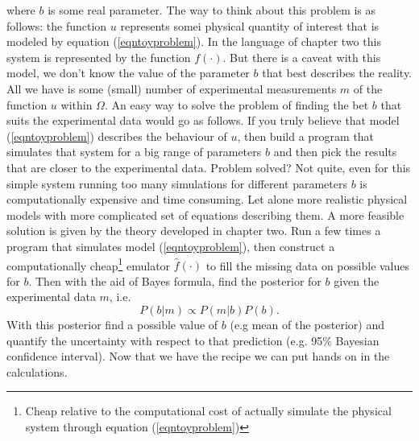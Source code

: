 \documentclass[12pt]{book}
\begin{document}
where $b$ is some real parameter. The  way to think about this problem is as follows: the 
function $u$ represents somei physical quantity of interest that is modeled by equation (\ref{eqntoyproblem}).
In the language of chapter two this system is represented by the function $f(\cdot)$. But there is a 
caveat with this model, we don't know the value of the parameter $b$ that best describes the reality.
All we have is some (small) number of experimental measurements $m$  of the function $u$ within $\Omega$. 
An easy way to solve the problem of finding the bet $b$ that suits the experimental data would go as follows.
If you truly believe that model (\ref{eqntoyproblem}) describes the behaviour of $u$, then build
a program that simulates that system for a big range of parameters $b$ and then pick the results
that are closer to the experimental data. Problem solved? Not quite, even for this simple system
running too many simulations for different parameters $b$ is computationally expensive and time
consuming. Let alone more realistic physical models with more complicated set of equations describing
them. 
\newline
A more feasible solution is given by the theory developed in chapter two. Run a few times a program
that simulates model (\ref{eqntoyproblem}), then construct a computationally cheap\footnote{Cheap relative
to the computational cost of actually simulate the physical system through equation (\ref{eqntoyproblem})}
 emulator $\hat{f}(\cdot)$ to fill the missing data on possible values for $b$. Then with  the 
aid of Bayes formula, find the posterior for $b$ given the experimental data $m$, i.e.
\begin{equation}\label{eqnpropto}
P(b|m)\propto P(m|b)P(b).
\end{equation}
With this posterior find a possible value of $b$ (e.g mean of the posterior) and quantify the uncertainty
with respect to that prediction (e.g. 95\% Bayesian confidence interval). Now that we have the recipe we
can put hands on in the calculations. 
\newline
\end{document}
